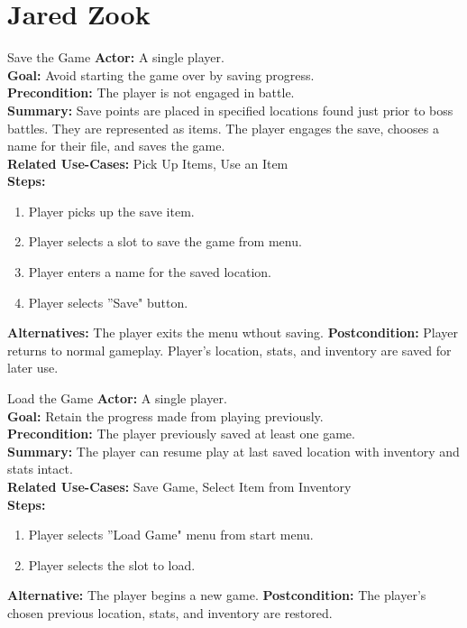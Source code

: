 \documentclass[12pt]{report}
\begin{document}
\section{Jared Zook}

\begin{subsection}{Save the Game}
\textbf{Actor:} A single player. \\
\textbf{Goal:} Avoid starting the game over by saving progress. \\
\textbf{Precondition:} The player is not engaged in battle. \\
\textbf{Summary:} Save points are placed in specified locations found just prior to boss battles. They are represented as items. The player engages the save, chooses a name for their file, and saves the game.  \\
\textbf{Related Use-Cases:} Pick Up Items, Use an Item \\
\textbf{Steps:}
\begin{enumerate}
   \item Player picks up the save item.
   \item Player selects a slot to save the game from menu.
   \item Player enters a name for the saved location.
   \item Player selects ''Save" button.
\end{enumerate}
\textbf{Alternatives:} The player exits the menu wthout saving.
\textbf{Postcondition:} Player returns to normal gameplay. Player's location, stats, and inventory are saved for later use.
\end{subsection}

\begin{subsection}{Load the Game}
\textbf{Actor:} A single player. \\
\textbf{Goal:} Retain the progress made from playing previously. \\
\textbf{Precondition:} The player previously saved at least one game. \\
\textbf{Summary:} The player can resume play at last saved location with inventory and stats intact.  \\
\textbf{Related Use-Cases:} Save Game, Select Item from Inventory \\
\textbf{Steps:}
\begin{enumerate}
   \item Player selects ''Load Game" menu from start menu.
   \item Player selects the slot to load.
\end{enumerate}
\textbf{Alternative:} The player begins a new game.
\textbf{Postcondition:} The player's chosen previous location, stats, and inventory are restored.
\end{subsection}
\end{document}
